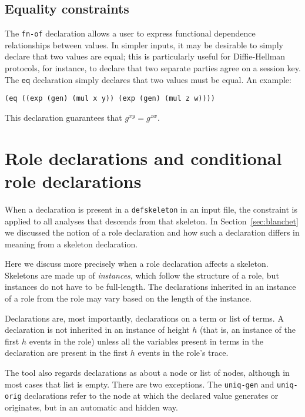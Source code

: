 \subsection{Equality constraints}

  The \texttt{fn-of} declaration allows a
user to express functional dependence relationships between values.
In simpler inputs, it may be desirable to simply declare that two
values are equal; this is particularly useful for Diffie-Hellman
protocols, for instance, to declare that two separate parties agree on
a session key.  The \texttt{eq} declaration simply declares that two
values must be equal.  An example:

\begin{center}
  \verb|(eq ((exp (gen) (mul x y)) (exp (gen) (mul z w))))|
\end{center}

This declaration guarantees that $g^{xy} = g^{zw}$.

\section{Role declarations and conditional role declarations}
\label{sec:role_decls2}

 When a declaration is present in a
\texttt{defskeleton} in an input file, the constraint is applied to
all analyses that descends from that skeleton.  In
Section~\ref{sec:blanchet} we discussed the notion of a role
declaration and how such a declaration differs in meaning from a
skeleton declaration.

Here we discuss more precisely when a role declaration affects a
skeleton.  Skeletons are made up of \emph{instances}, which follow
the structure of a role, but instances do not have to be full-length.
The declarations inherited in an instance of a role from the role
may vary based on the length of the instance.

Declarations are, most importantly, declarations on a term or list of
terms.  A declaration is not inherited in an instance of height $h$
(that is, an instance of the first $h$ events in the role) unless all the
variables present in terms in the declaration are present in the first $h$
events in the role's trace.

The tool also regards declarations as about a node or list of nodes,
although in most cases that list is empty.  There are two exceptions.
  The \texttt{uniq-gen} and
\texttt{uniq-orig} declarations refer to the node at which the
declared value generates or originates, but in an automatic and
hidden way.

